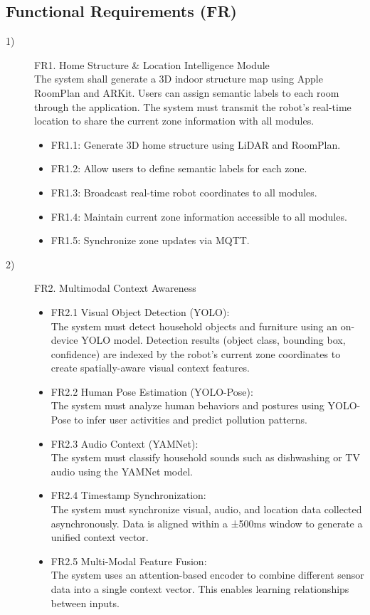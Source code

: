 \documentclass[conference]{IEEEtran}
\begin{document}
\subsection{Functional Requirements (FR)}
\begin{description}
    \item[1)] FR1. Home Structure \& Location Intelligence Module \\
    The system shall generate a 3D indoor structure map using Apple RoomPlan and ARKit. Users can assign semantic labels to each room through the application. The system must transmit the robot's real-time location to share the current zone information with all modules.
    \begin{itemize}
        \item FR1.1: Generate 3D home structure using LiDAR and RoomPlan.
        \item FR1.2: Allow users to define semantic labels for each zone.
        \item FR1.3: Broadcast real-time robot coordinates to all modules.
        \item FR1.4: Maintain current zone information accessible to all modules.
        \item FR1.5: Synchronize zone updates via MQTT.
    \end{itemize}

    \vspace{1em}
    
    \item[2)] FR2. Multimodal Context Awareness
    \begin{itemize}
        \item FR2.1 Visual Object Detection (YOLO): \\
        The system must detect household objects and furniture using an on-device YOLO model. Detection results (object class, bounding box, confidence) are indexed by the robot's current zone coordinates to create spatially-aware visual context features.
        \item FR2.2 Human Pose Estimation (YOLO-Pose): \\
        The system must analyze human behaviors and postures using YOLO-Pose to infer user activities and predict pollution patterns.
        \item FR2.3 Audio Context (YAMNet): \\
        The system must classify household sounds such as dishwashing or TV audio using the YAMNet model.
        \item FR2.4 Timestamp Synchronization: \\
        The system must synchronize visual, audio, and location data collected asynchronously. Data is aligned within a ±500ms window to generate a unified context vector.
        \item FR2.5 Multi-Modal Feature Fusion: \\
        The system uses an attention-based encoder to combine different sensor data into a single context vector. This enables learning relationships between inputs.


\end{itemize}
\end{description}
\end{document}
